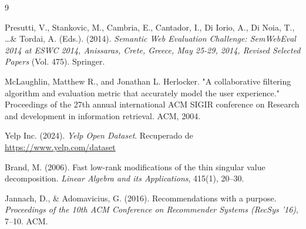 \documentclass[11pt,a4paper]{article}
\begin{document}
\begin{thebibliography}{9}

Presutti, V., Stankovic, M., Cambria, E., Cantador, I., Di Iorio, A., Di Noia, T., \ldots \& Tordai, A. (Eds.). (2014).
\textit{Semantic Web Evaluation Challenge: SemWebEval 2014 at ESWC 2014, Anissaras, Crete, Greece, May 25-29, 2014, Revised Selected Papers} (Vol. 475). Springer.

McLaughlin,  Matthew  R.,  and  Jonathan  L.  Herlocker.  "A  collaborative  filtering  algorithm  and  evaluation metric that accurately model the user experience." Proceedings of the 27th annual international ACM SIGIR
conference on Research and development in information retrieval. ACM, 2004.

Yelp Inc. (2024). \textit{Yelp Open Dataset}. Recuperado de \url{https://www.yelp.com/dataset}

Brand, M. (2006). Fast low-rank modifications of the thin singular value decomposition. \textit{Linear Algebra and its Applications}, 415(1), 20--30.

Jannach, D., \& Adomavicius, G. (2016). Recommendations with a purpose. \textit{Proceedings of the 10th ACM Conference on Recommender Systems (RecSys '16)}, 7--10. ACM.

\end{thebibliography}
\end{document}
